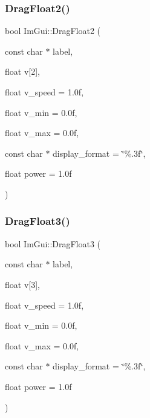 \mbox{\label{namespace_im_gui_a2852e4c3b872ed5a5d28047f0290f29c}} 
\subsubsection{\texorpdfstring{Drag\+Float2()}{DragFloat2()}}
{\footnotesize\ttfamily bool Im\+Gui\+::\+Drag\+Float2 (\begin{DoxyParamCaption}\item[{const char $\ast$}]{label,  }\item[{float}]{v\mbox{[}2\mbox{]},  }\item[{float}]{v\+\_\+speed = {\ttfamily 1.0f},  }\item[{float}]{v\+\_\+min = {\ttfamily 0.0f},  }\item[{float}]{v\+\_\+max = {\ttfamily 0.0f},  }\item[{const char $\ast$}]{display\+\_\+format = {\ttfamily \char`\"{}\%.3f\char`\"{}},  }\item[{float}]{power = {\ttfamily 1.0f} }\end{DoxyParamCaption})}

\mbox{\label{namespace_im_gui_a3a365703646c6fb5357f21a13c531bfe}} 
\subsubsection{\texorpdfstring{Drag\+Float3()}{DragFloat3()}}
{\footnotesize\ttfamily bool Im\+Gui\+::\+Drag\+Float3 (\begin{DoxyParamCaption}\item[{const char $\ast$}]{label,  }\item[{float}]{v\mbox{[}3\mbox{]},  }\item[{float}]{v\+\_\+speed = {\ttfamily 1.0f},  }\item[{float}]{v\+\_\+min = {\ttfamily 0.0f},  }\item[{float}]{v\+\_\+max = {\ttfamily 0.0f},  }\item[{const char $\ast$}]{display\+\_\+format = {\ttfamily \char`\"{}\%.3f\char`\"{}},  }\item[{float}]{power = {\ttfamily 1.0f} }\end{DoxyParamCaption})}

